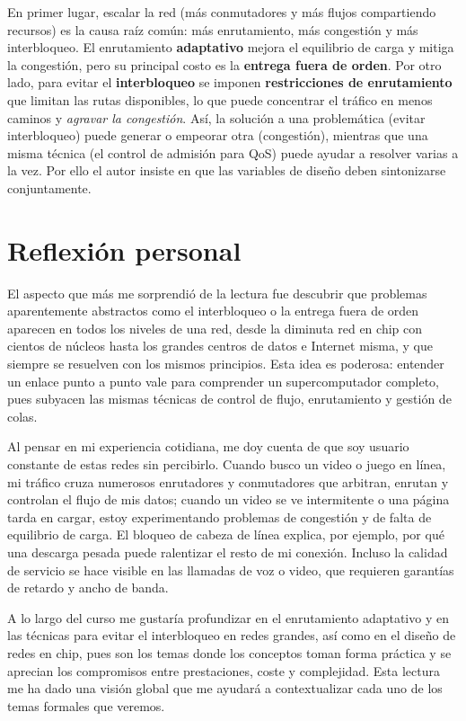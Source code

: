 \documentclass[12pt,a4paper]{article}
\begin{document}
En primer lugar, escalar la red (más conmutadores y más flujos compartiendo recursos) es la causa raíz común: más enrutamiento, más congestión y más interbloqueo. El enrutamiento \textbf{adaptativo} mejora el equilibrio de carga y mitiga la congestión, pero su principal costo es la \textbf{entrega fuera de orden}. Por otro lado, para evitar el \textbf{interbloqueo} se imponen \textbf{restricciones de enrutamiento} que limitan las rutas disponibles, lo que puede concentrar el tráfico en menos caminos y \emph{agravar la congestión}. Así, la solución a una problemática (evitar interbloqueo) puede generar o empeorar otra (congestión), mientras que una misma técnica (el control de admisión para QoS) puede ayudar a resolver varias a la vez. Por ello el autor insiste en que las variables de diseño deben sintonizarse conjuntamente.


\section{Reflexión personal}

El aspecto que más me sorprendió de la lectura fue descubrir que problemas aparentemente abstractos como el interbloqueo o la entrega fuera de orden aparecen en todos los niveles de una red, desde la diminuta red en chip con cientos de núcleos hasta los grandes centros de datos e Internet misma, y que siempre se resuelven con los mismos principios. Esta idea es poderosa: entender un enlace punto a punto vale para comprender un supercomputador completo, pues subyacen las mismas técnicas de control de flujo, enrutamiento y gestión de colas.

Al pensar en mi experiencia cotidiana, me doy cuenta de que soy usuario constante de estas redes sin percibirlo. Cuando busco un video o juego en línea, mi tráfico cruza numerosos enrutadores y conmutadores que arbitran, enrutan y controlan el flujo de mis datos; cuando un video se ve intermitente o una página tarda en cargar, estoy experimentando problemas de congestión y de falta de equilibrio de carga. El bloqueo de cabeza de línea explica, por ejemplo, por qué una descarga pesada puede ralentizar el resto de mi conexión. Incluso la calidad de servicio se hace visible en las llamadas de voz o video, que requieren garantías de retardo y ancho de banda.

A lo largo del curso me gustaría profundizar en el enrutamiento adaptativo y en las técnicas para evitar el interbloqueo en redes grandes, así como en el diseño de redes en chip, pues son los temas donde los conceptos toman forma práctica y se aprecian los compromisos entre prestaciones, coste y complejidad. Esta lectura me ha dado una visión global que me ayudará a contextualizar cada uno de los temas formales que veremos.
\end{document}
